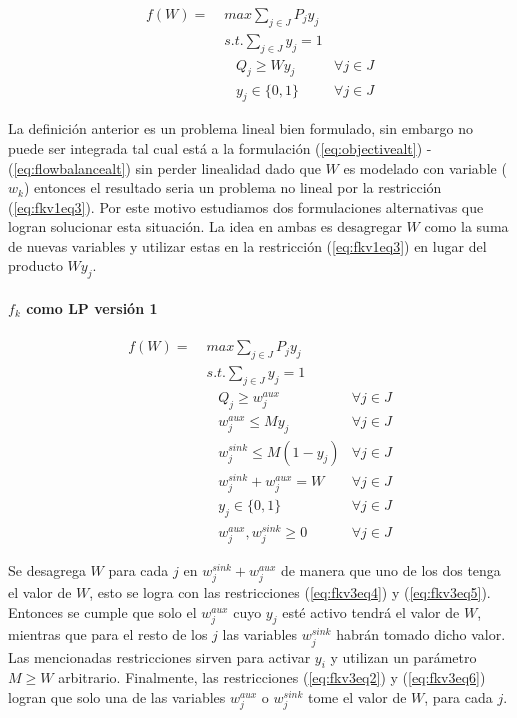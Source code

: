 \documentclass{article}
\begin{document}
  \begin{align}
    f(W) =\; & max \sum_{j \in J} P_j y_j    & \label{eq:fkv1eq1}\\
             & s.t. \sum_{j \in J} y_j = 1   & \label{eq:fkv1eq2} \\
             & \;\;\; Q_j \geq W y_j         & \label{eq:fkv1eq3} \forall j \in J \\
             & \;\;\; y_j \in \{0,1\}        & \label{eq:fkv1eq4} \forall j \in J
  \end{align}


  La definición anterior es un problema lineal bien formulado, sin embargo no puede ser integrada tal cual está a la formulación (\ref{eq:objectivealt}) - (\ref{eq:flowbalancealt}) sin perder linealidad dado que $W$ es modelado con variable ($w_k$) entonces el resultado seria un problema no lineal por la restricción (\ref{eq:fkv1eq3}). Por este motivo estudiamos dos formulaciones alternativas que logran solucionar esta situación. La idea en ambas es desagregar $W$ como la suma de nuevas variables y utilizar estas en la restricción (\ref{eq:fkv1eq3}) en lugar del producto $W y_j$.

  \paragraph*{$f_k$ como LP versión 1}

  \begin{align}
    f(W) =\; & max \sum_{j \in J} P_j y_j             & \label{eq:fkv3eq1}\\
             & s.t. \sum_{j \in J} y_j = 1            & \label{eq:fkv3eq2}\\
             & \;\;\; Q_j \geq w^{aux}_j              & \forall j \in J \label{eq:fkv3eq3} \\
             & \;\;\; w^{aux}_j \leq M y_j            & \forall j \in J \label{eq:fkv3eq4} \\
             & \;\;\; w^{sink}_j \leq M (1 - y_j)     & \forall j \in J \label{eq:fkv3eq5} \\
             & \;\;\; w^{sink}_j + w^{aux}_j = W      & \label{eq:fkv3eq6} \forall j \in J\\
             & \;\;\; y_j \in \{0,1\}                 & \label{eq:fkv3domainy} \forall j \in J \\
             & \;\;\; w^{aux}_j, w^{sink}_j \geq 0    & \label{eq:fkv3eq7} \forall j \in J
  \end{align}

  Se desagrega $W$ para cada $j$ en $w^{sink}_j + w^{aux}_j$ de manera que uno de los dos tenga el valor de $W$, esto se logra con las restricciones (\ref{eq:fkv3eq4}) y (\ref{eq:fkv3eq5}). Entonces se cumple que solo el $w^{aux}_j$ cuyo $y_j$ esté activo tendrá el valor de $W$, mientras que para el resto de los $j$ las variables $w^{sink}_j$ habrán tomado dicho valor. Las mencionadas restricciones sirven para activar $y_i$ y utilizan un parámetro $M \geq W$ arbitrario. Finalmente, las restricciones (\ref{eq:fkv3eq2}) y (\ref{eq:fkv3eq6}) logran que solo una de las variables $w^{aux}_j$ o $w^{sink}_j$ tome el valor de $W$, para cada $j$.
\end{document}
